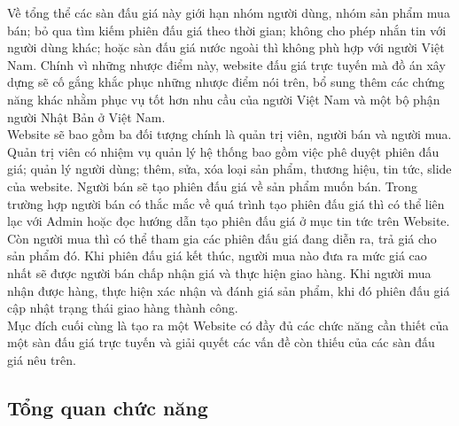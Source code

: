 \documentclass{article}
\begin{document}
Về tổng thể các sàn đấu giá này giới hạn nhóm người dùng, nhóm sản phẩm mua bán; bỏ qua tìm kiếm phiên đấu giá theo thời gian; không cho phép nhắn tin với người dùng khác; hoặc sàn đấu giá nước ngoài thì không phù hợp với người Việt Nam. Chính vì những nhược điểm này, website đấu giá trực tuyến mà đồ án xây dựng sẽ cố gắng khắc phục những nhược điểm nói trên, bổ sung thêm các chứng năng khác nhằm phục vụ tốt hơn nhu cầu của người Việt Nam và một bộ phận người Nhật Bản ở Việt Nam.\\
Website sẽ bao gồm ba đối tượng chính là quản trị viên, người bán và người mua. Quản trị viên có nhiệm vụ quản lý hệ thống bao gồm việc phê duyệt phiên đấu giá; quản lý người dùng; thêm, sửa, xóa loại sản phẩm, thương hiệu, tin tức, slide của website. Người bán sẽ tạo phiên đấu giá về sản phẩm muốn bán. Trong trường hợp người bán có thắc mắc về quá trình tạo phiên đấu giá thì có thể liên lạc với Admin hoặc đọc hướng dẫn tạo phiên đấu giá ở mục tin tức trên Website. Còn người mua thì có thể tham gia các phiên đấu giá đang diễn ra, trả giá cho sản phẩm đó. Khi phiên đấu giá kết thúc, người mua nào đưa ra mức giá cao nhất sẽ được người bán chấp nhận giá và thực hiện giao hàng. Khi người mua nhận được hàng, thực hiện xác nhận và đánh giá sản phẩm, khi đó phiên đấu giá cập nhật trạng thái giao hàng thành công.\\
Mục đích cuối cùng là tạo ra một Website có đầy đủ các chức năng cần thiết của một sàn đấu giá trực tuyến và giải quyết các vấn đề còn thiếu của các sàn đấu giá nêu trên.
\subsection{Tổng quan chức năng}
\end{document}
